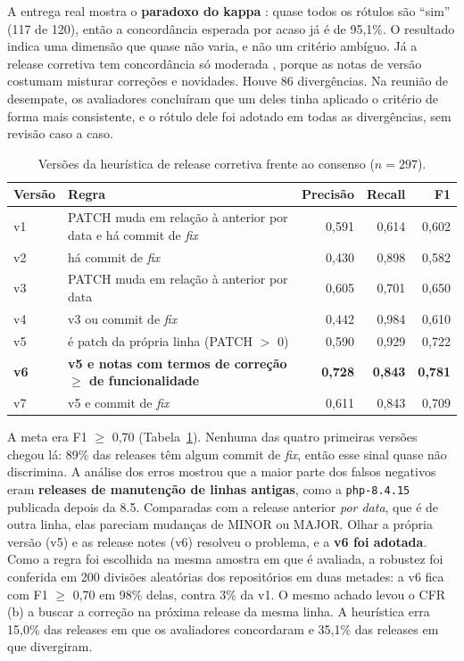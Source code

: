 \documentclass[12pt]{article}
\begin{document}
A entrega real mostra o \textbf{paradoxo do kappa} \cite{feinstein1990}: quase todos os rótulos são ``sim'' (117 de 120), então a concordância esperada por acaso já é de 95,1\%. O resultado indica uma dimensão que quase não varia, e não um critério ambíguo. Já a release corretiva tem concordância só moderada \cite{landis1977}, porque as notas de versão costumam misturar correções e novidades. Houve 86 divergências. Na reunião de desempate, os avaliadores concluíram que um deles tinha aplicado o critério de forma mais consistente, e o rótulo dele foi adotado em todas as divergências, sem revisão caso a caso.

\begin{table}[ht]
\centering
\caption{Versões da heurística de release corretiva frente ao consenso ($n = 297$).}
\label{tab:heuristica}
\small
\begin{tabular}{lp{7.6cm}rrr}
\hline
Versão & Regra & Precisão & Recall & F1 \\
\hline
v1 & PATCH muda em relação à anterior por data e há commit de \textit{fix} & 0,591 & 0,614 & 0,602 \\
v2 & há commit de \textit{fix} & 0,430 & 0,898 & 0,582 \\
v3 & PATCH muda em relação à anterior por data & 0,605 & 0,701 & 0,650 \\
v4 & v3 ou commit de \textit{fix} & 0,442 & 0,984 & 0,610 \\
v5 & é patch da própria linha (PATCH $>$ 0) & 0,590 & 0,929 & 0,722 \\
\textbf{v6} & \textbf{v5 e notas com termos de correção $\geq$ de funcionalidade} & \textbf{0,728} & \textbf{0,843} & \textbf{0,781} \\
v7 & v5 e commit de \textit{fix} & 0,611 & 0,843 & 0,709 \\
\hline
\end{tabular}
\end{table}

A meta era F1 $\geq$ 0,70 (Tabela~\ref{tab:heuristica}). Nenhuma das quatro primeiras versões chegou lá: 89\% das releases têm algum commit de \textit{fix}, então esse sinal quase não discrimina. A análise dos erros mostrou que a maior parte dos falsos negativos eram \textbf{releases de manutenção de linhas antigas}, como a \texttt{php-8.4.15} publicada depois da 8.5. Comparadas com a release anterior \textit{por data}, que é de outra linha, elas pareciam mudanças de MINOR ou MAJOR. Olhar a própria versão (v5) e as release notes (v6) resolveu o problema, e a \textbf{v6 foi adotada}. Como a regra foi escolhida na mesma amostra em que é avaliada, a robustez foi conferida em 200 divisões aleatórias dos repositórios em duas metades: a v6 fica com F1 $\geq$ 0,70 em 98\% delas, contra 3\% da v1. O mesmo achado levou o CFR (b) a buscar a correção na próxima release da mesma linha. A heurística erra 15,0\% das releases em que os avaliadores concordaram e 35,1\% das releases em que divergiram.
\end{document}
